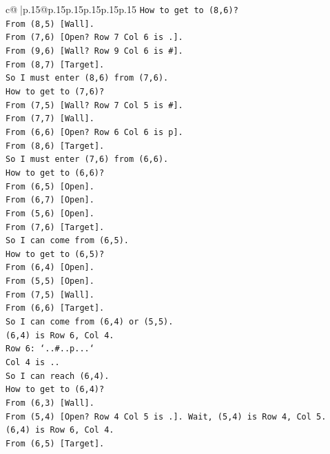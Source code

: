 \documentclass{article}
\begin{document}
{\begin{supertabular}{c@{$\;$}|p{.15\linewidth}@{}p{.15\linewidth}p{.15\linewidth}p{.15\linewidth}p{.15\linewidth}p{.15\linewidth}}
{{{\texttt{How to get to (8,6)?} \\
\texttt{From (8,5) {[}Wall{]}.} \\
\texttt{From (7,6) {[}Open? Row 7 Col 6 is .{]}.} \\
\texttt{From (9,6) {[}Wall? Row 9 Col 6 is \#{]}.} \\
\texttt{From (8,7) {[}Target{]}.} \\
\texttt{So I must enter (8,6) from (7,6).} \\
\texttt{How to get to (7,6)?} \\
\texttt{From (7,5) {[}Wall? Row 7 Col 5 is \#{]}.} \\
\texttt{From (7,7) {[}Wall{]}.} \\
\texttt{From (6,6) {[}Open? Row 6 Col 6 is p{]}.} \\
\texttt{From (8,6) {[}Target{]}.} \\
\texttt{So I must enter (7,6) from (6,6).} \\
\texttt{How to get to (6,6)?} \\
\texttt{From (6,5) {[}Open{]}.} \\
\texttt{From (6,7) {[}Open{]}.} \\
\texttt{From (5,6) {[}Open{]}.} \\
\texttt{From (7,6) {[}Target{]}.} \\
\texttt{So I can come from (6,5).} \\
\texttt{How to get to (6,5)?} \\
\texttt{From (6,4) {[}Open{]}.} \\
\texttt{From (5,5) {[}Open{]}.} \\
\texttt{From (7,5) {[}Wall{]}.} \\
\texttt{From (6,6) {[}Target{]}.} \\
\texttt{So I can come from (6,4) or (5,5).} \\
\texttt{(6,4) is Row 6, Col 4.} \\
\texttt{Row 6: `..\#..p...`} \\
\texttt{Col 4 is ..} \\
\texttt{So I can reach (6,4).} \\
\texttt{How to get to (6,4)?} \\
\texttt{From (6,3) {[}Wall{]}.} \\
\texttt{From (5,4) {[}Open? Row 4 Col 5 is .{]}. Wait, (5,4) is Row 4, Col 5.} \\
\texttt{(6,4) is Row 6, Col 4.} \\
\texttt{From (6,5) {[}Target{]}.} \\
}}}
\end{supertabular}}
\end{document}
